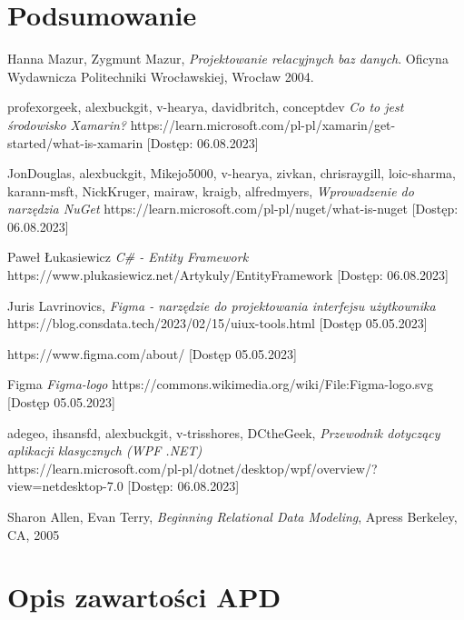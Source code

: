 \documentclass[12pt,oneside]{report}
\begin{document}
\chapter{Podsumowanie}
\begin{thebibliography}{9}
	
	Hanna Mazur, Zygmunt Mazur,
	\emph{Projektowanie relacyjnych baz danych}.
	Oficyna Wydawnicza Politechniki Wrocławskiej, Wrocław 2004.

	 profexorgeek, alexbuckgit, v-hearya, davidbritch, conceptdev \emph{Co to jest środowisko Xamarin?}
	https://learn.microsoft.com/pl-pl/xamarin/get-started/what-is-xamarin [Dostęp: 06.08.2023] 

	 JonDouglas, alexbuckgit, Mikejo5000, v-hearya, zivkan, chrisraygill, loic-sharma, karann-msft, NickKruger,	mairaw, kraigb, alfredmyers, \emph{Wprowadzenie do narzędzia NuGet} https://learn.microsoft.com/pl-pl/nuget/what-is-nuget 
	[Dostęp: 06.08.2023]

	Paweł Łukasiewicz \emph{C\# - Entity Framework} https://www.plukasiewicz.net/Artykuly/EntityFramework
	[Dostęp: 06.08.2023]

	 Juris Lavrinovics, \emph{Figma - narzędzie do projektowania interfejsu użytkownika}
	https://blog.consdata.tech/2023/02/15/uiux-tools.html 
	[Dostęp 05.05.2023]

	https://www.figma.com/about/ 
	[Dostęp 05.05.2023]

	Figma \emph{Figma-logo} https://commons.wikimedia.org/wiki/File:Figma-logo.svg 
	[Dostęp 05.05.2023]
	
	 adegeo, ihsansfd, alexbuckgit, v-trisshores, DCtheGeek, \emph{Przewodnik dotyczący aplikacji klasycznych (WPF .NET)}\\ https://learn.microsoft.com/pl-pl/dotnet/desktop/wpf/overview/?view=netdesktop-7.0 
	[Dostęp: 06.08.2023]
	
	  Sharon Allen, Evan Terry, \emph{Beginning Relational Data Modeling}, Apress Berkeley, CA, 2005
\end{thebibliography}
\listoffigures
\lstlistoflistings
\listoftables
\chapter{Opis zawartości APD}
\end{document}
